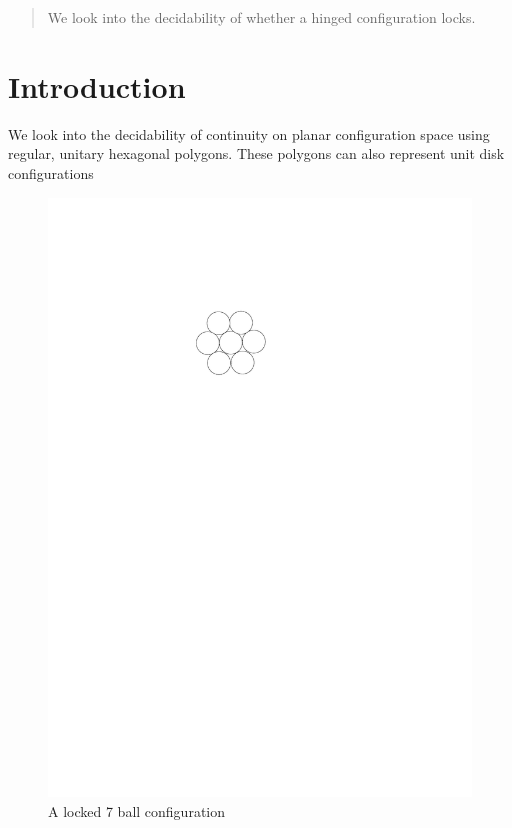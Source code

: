 \begin{abstract}
We look into the decidability of whether a hinged configuration locks.
\end{abstract}
\section{Introduction}
We look into the decidability of continuity on planar configuration space using regular, unitary hexagonal polygons.  These polygons can also represent unit disk configurations \cite{Breu19983} 
\begin{figure}[h]
\begin{center}
\includegraphics{graphics/7ballLocked.pdf}
\caption{A locked 7 ball configuration}
\label{figure:7ballLocked}
\end{center} 
\end{figure}

